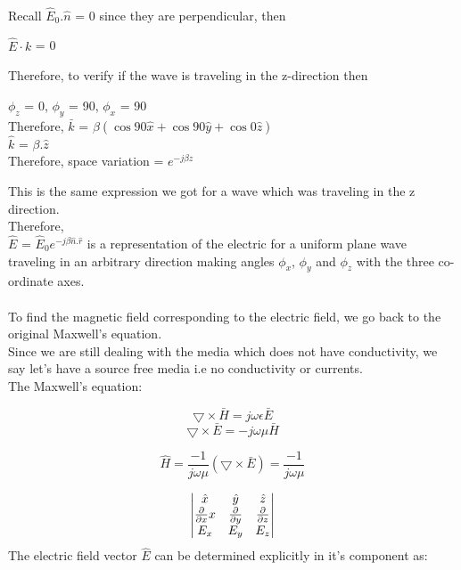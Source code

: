 \\
Recall $\hat{E}_{0}.\hat{n}$ = 0 since they are perpendicular, then
\begin{center}
$\hat{E}\cdot k$ = 0
\end{center}
Therefore, to verify if the wave is traveling in the z-direction then
\begin{center}
	$\phi_{z}$ = 0, $\phi_{y}$ = 90\textdegree, $\phi_{x}$ = 90\textdegree\\
	Therefore, $\bar{k}$ = $\beta(\cos90\hat{x} + \cos90\hat{y} + \cos0\hat{z})$
	\\
	$\hat{k}$ = $\beta.\hat{z}$
	\\
	Therefore, space variation = $e^{-j\beta z}$
\end{center}
This is the same expression we got for a wave which was traveling in the z direction.
\\Therefore,
\\
$\hat{E}$ = $\hat{E}_{0} e^{-j\beta\hat{n}.\hat{r}}$ is a representation of the electric for a uniform plane wave traveling in an arbitrary direction making angles $\phi_{x}$, $\phi_{y}$ and $\phi_{z}$ with the three co-ordinate axes.
\\
\\
To find the magnetic field corresponding to the electric field, we go back to the original Maxwell's equation.
\\
Since we are still dealing with the media which does not have conductivity, we say let's have a source free media i.e no conductivity or currents.
\\
The Maxwell's equation:

\begin{equation}
	\bigtriangledown\times\bar{H} = j\omega\epsilon\bar{E}
\end{equation}
\begin{equation}
	\bigtriangledown\times\bar{E} = -j\omega\mu\bar{H}
\end{equation}

\begin{equation}
	\hat{H} = \frac{-1}{j\omega\mu}(\bigtriangledown\times\bar{E}) = 
	\frac{-1}{j\omega\mu}
\end{equation}

\[ 
\begin{vmatrix}
$$\hat{x}$$ & $$\hat{y}$$ & $$\hat{z}$$\\
$$\frac{\partial}{\partial x}$$ x & $$\frac{\partial}{\partial y}$$ & $$\frac{\partial}{\partial z}$$\\
$$E_{x}$$ & $$E_{y}$$ & $$E_{z}$$
\end{vmatrix}
 \]
\newline
The electric field vector $\hat{E}$ can be determined explicitly in it's component as:

